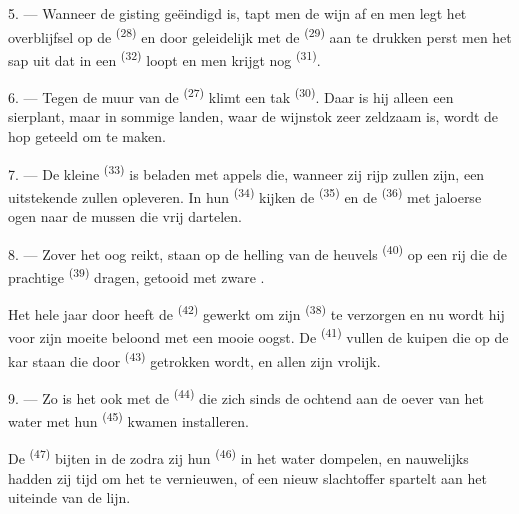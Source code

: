 5. --- Wanneer de gisting geëindigd is, tapt men de wijn af en men legt het overblijfsel op de
 \textsuperscript{(28)} en door geleidelijk met de 
\textsuperscript{(29)} aan te drukken perst men het sap uit dat in een 
\textsuperscript{(32)} loopt en men krijgt nog  \textsuperscript{(31)}.

\VUsaut{6.0mm}
\VUsaut{3.4mm}

6. --- Tegen de muur van de  \textsuperscript{(27)} klimt een tak
 \textsuperscript{(30)}. Daar is hij alleen een sierplant, maar in
sommige landen, waar de wijnstok zeer zeldzaam is, wordt de hop geteeld om
 te maken.

7. --- De kleine  \textsuperscript{(33)} is beladen met appels die, wanneer
zij rijp zullen zijn, een uitstekende  zullen opleveren. In hun 
\textsuperscript{(34)} kijken de
 \textsuperscript{(35)} en de 
\textsuperscript{(36)} met jaloerse ogen naar de mussen die vrij dartelen.

8. --- Zover het oog reikt, staan op de helling van de heuvels
 \textsuperscript{(40)} op een rij die de prachtige
 \textsuperscript{(39)} dragen, getooid met zware
.

Het hele jaar door heeft de  \textsuperscript{(42)} gewerkt om zijn
 \textsuperscript{(38)} te verzorgen en nu wordt hij voor zijn moeite
beloond met een mooie oogst. De  \textsuperscript{(41)} vullen de kuipen
die op de kar staan die door
 \textsuperscript{(43)} getrokken wordt, en allen zijn vrolijk.

\VUsaut{5.0mm}
\VUsaut{3.4mm}

9. --- Zo is het ook met de  \textsuperscript{(44)} die zich sinds de
ochtend aan de oever van het water met hun  \textsuperscript{(45)} kwamen
installeren.

De  \textsuperscript{(47)} bijten in de  zodra zij hun
 \textsuperscript{(46)} in het water dompelen, en nauwelijks hadden zij tijd om
het  te vernieuwen, of een nieuw slachtoffer spartelt aan het uiteinde van de
lijn.

